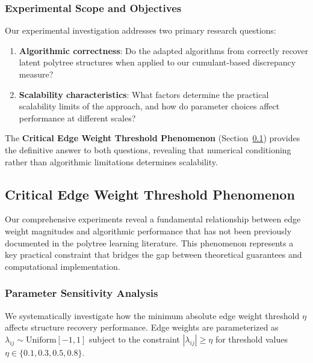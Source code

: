 \documentclass[11pt,a4paper]{article}
\numberwithin{equation}{section}
\begin{document}
\subsubsection{Experimental Scope and Objectives}

Our experimental investigation addresses two primary research questions:

\begin{enumerate}[label=(\arabic*)]
\item \textbf{Algorithmic correctness}: Do the adapted algorithms from \citet{etesami:kiyavash:coleman:2016} correctly recover latent polytree structures when applied to our cumulant-based discrepancy measure?

\item \textbf{Scalability characteristics}: What factors determine the practical scalability limits of the approach, and how do parameter choices affect performance at different scales?
\end{enumerate}

The \textbf{Critical Edge Weight Threshold Phenomenon} (Section~\ref{subsec:threshold_phenomenon}) provides the definitive answer to both questions, revealing that numerical conditioning rather than algorithmic limitations determines scalability.


\subsection{Critical Edge Weight Threshold Phenomenon}
\label{subsec:threshold_phenomenon}

Our comprehensive experiments reveal a fundamental relationship between edge weight magnitudes and algorithmic performance that has not been previously documented in the polytree learning literature. This phenomenon represents a key practical constraint that bridges the gap between theoretical guarantees and computational implementation.

\subsubsection{Parameter Sensitivity Analysis}

We systematically investigate how the minimum absolute edge weight threshold $\eta$ affects structure recovery performance. Edge weights are parameterized as $\lambda_{ij} \sim \text{Uniform}[-1,1]$ subject to the constraint $|\lambda_{ij}| \geq \eta$ for threshold values $\eta \in \{0.1, 0.3, 0.5, 0.8\}$.
\end{document}
